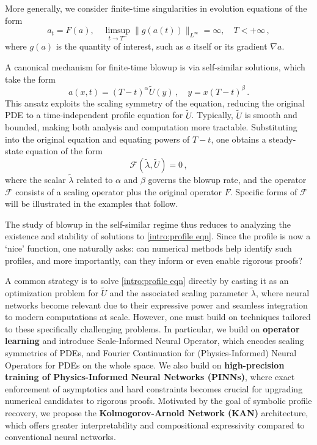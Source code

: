 \documentclass[12pt]{caltech_thesis}
\numberwithin{equation}{section}
\begin{document}
More generally, we consider finite-time singularities in evolution equations of the form \begin{equation}
    \label{intro:blowup}
    a_t=F(a),\quad \limsup_{t \rightarrow T^{-}}\|g(a(t))\|_{L^{\infty}}=\infty, \quad T<+\infty\,,
\end{equation}
where $g(a)$ is the quantity of interest, such as $a$ itself or its gradient $\nabla a$. 

A canonical mechanism for finite-time blowup is via self-similar solutions, which take the form \begin{equation}
    \label{intro:ss ansatz}
    a(x,t)=(T-t)^\alpha \tilde{U}(y)\,,\quad y=x(T-t)^\beta\,.
\end{equation} This ansatz exploits the scaling symmetry of the equation, reducing the original PDE to a time-independent profile equation for 
$\tilde{U}$. Typically, $\tilde{U}$
  is smooth and bounded, making both analysis and computation more tractable. Substituting into the original equation and equating powers of 
$T-t$, one obtains a steady-state equation of the form
\begin{equation}
    \label{intro:profile eqn}
    \mathcal{F}(\tilde{\lambda},\tilde{U})=0\,,
\end{equation}
where the scalar $\tilde{\lambda}$ related to $\alpha$ and $\beta$ governs the blowup rate, and the operator $\mathcal{F}$ consists of a scaling operator plus the original operator $F$. Specific forms of $\mathcal{F}$ will be illustrated in the examples that follow.

The study of blowup in the self-similar regime thus reduces to analyzing the existence and stability of solutions to \eqref{intro:profile eqn}. Since the profile is now a `nice' function, one naturally asks: can numerical methods help identify such profiles, and more importantly, can they inform or even enable rigorous proofs? 

A common strategy is to solve \eqref{intro:profile eqn} directly by casting it as an optimization problem for $\tilde{U}$ and the associated scaling parameter $\tilde{\lambda}$, where neural networks become relevant due to their expressive power and seamless integration to modern computations at scale. However, one must build on techniques tailored to these specifically challenging problems. In particular, we build on \textbf{operator learning} and introduce Scale-Informed Neural Operator, which encodes scaling symmetries of PDEs, and  Fourier Continuation for (Physics-Informed) Neural Operators for PDEs on the whole space. We also build on \textbf{high-precision training of Physics-Informed Neural
Networks (PINNs)}, where exact enforcement of asymptotics and hard constraints becomes crucial for upgrading numerical candidates to rigorous proofs. Motivated by the goal of symbolic profile recovery, we propose the \textbf{Kolmogorov-Arnold Network (KAN)} architecture, which offers greater interpretability and compositional expressivity compared to conventional neural networks.
\end{document}
